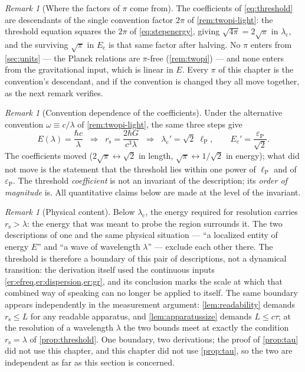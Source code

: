 \documentclass[11pt]{amsbook}
\theoremstyle{plain}
\theoremstyle{definition}
\theoremstyle{remark}
\newtheorem{remark}[theorem]{Remark}
\begin{document}
\begin{remark}[Where the factors of $\pi$ come from]\label{rem:sqrtpi}
The coefficients of \cref{eq:threshold} are descendants of the single convention factor $2\pi$ of \cref{rem:twopi-light}: the threshold equation squares the $2\pi$ of \cref{eq:stepenergy}, giving $\sqrt{4\pi} = 2\sqrt{\pi}$ in $\lambda_{\mathrm c}$, and the surviving $\sqrt{\pi}$ in $E_{\mathrm c}$ is that same factor after halving. No $\pi$ enters from \cref{sec:units} --- the Planck relations are $\pi$-free (\cref{rem:twopi}) --- and none enters from the gravitational input, which is linear in $E$. Every $\pi$ of this chapter is the convention's descendant, and if the convention is changed they all move together, as the next remark verifies.
\end{remark}

\begin{remark}[Convention dependence of the coefficients]\label{rem:convention-move}
Under the alternative convention $\omega \equiv c/\lambda$ of \cref{rem:twopi-light}, the same three steps give
\begin{equation}\label{eq:altconvention}
E(\lambda) = \frac{\hbar c}{\lambda}
\;\;\Longrightarrow\;\;
r_{\mathrm s} = \frac{2\hbar G}{c^{3}\lambda}
\;\;\Longrightarrow\;\;
\lambda_{\mathrm c}' = \sqrt{2}\; \ell_{\mathrm P},\qquad
E_{\mathrm c}' = \frac{\varepsilon_{\mathrm P}}{\sqrt{2}}.
\end{equation}
The coefficients moved ($2\sqrt{\pi} \leftrightarrow \sqrt{2}$ in length, $\sqrt{\pi} \leftrightarrow 1/\sqrt{2}$ in energy); what did not move is the statement that the threshold lies within one power of $\ell_{\mathrm P}$ and of $\varepsilon_{\mathrm P}$. The threshold \emph{coefficient} is not an invariant of the description; its \emph{order of magnitude} is. All quantitative claims below are made at the level of the invariant.
\end{remark}

\begin{remark}[Physical content]\label{rem:threshold-content}
Below $\lambda_{\mathrm c}$, the energy required for resolution carries $r_{\mathrm s} > \lambda$: the energy that was meant to probe the region surrounds it. The two descriptions of one and the same physical situation --- ``a localized entity of energy $E$'' and ``a wave of wavelength $\lambda$'' --- exclude each other there. The threshold is therefore a boundary of this pair of descriptions, not a dynamical transition: the derivation itself used the continuous inputs \cref{er:efreq,er:dispersion,er:gr}, and its conclusion marks the scale at which that combined way of speaking can no longer be applied to itself. The same boundary appears independently in the measurement argument: \cref{lem:readability} demands $r_{\mathrm s} \leq L$ for any readable apparatus, and \cref{lem:apparatussize} demands $L \leq c\tau$; at the resolution of a wavelength $\lambda$ the two bounds meet at exactly the condition $r_{\mathrm s} = \lambda$ of \cref{prop:threshold}. One boundary, two derivations; the proof of \cref{prop:tau} did not use this chapter, and this chapter did not use \cref{prop:tau}, so the two are independent as far as this section is concerned.
\end{remark}
\end{document}
